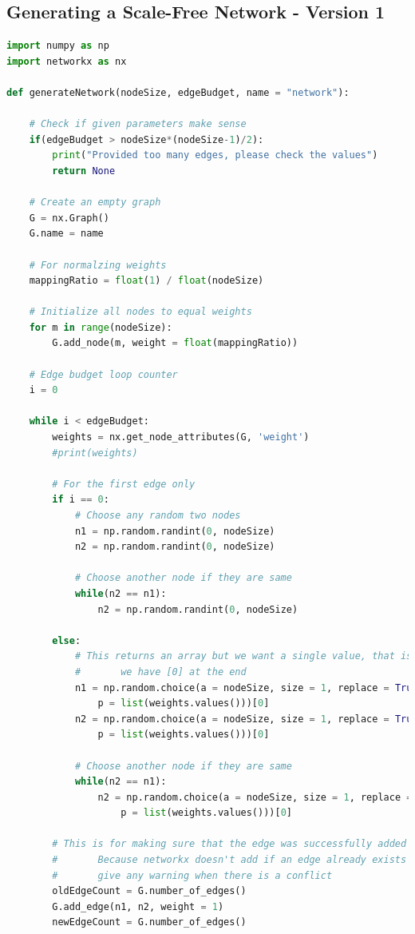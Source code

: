 \documentclass[journal]{IEEEtran}
\begin{document}
\subsection{Generating a Scale-Free Network - Version 1}
\begin{lstlisting}[language=Python]
import numpy as np
import networkx as nx

def generateNetwork(nodeSize, edgeBudget, name = "network"):

    # Check if given parameters make sense
    if(edgeBudget > nodeSize*(nodeSize-1)/2):
        print("Provided too many edges, please check the values")
        return None

    # Create an empty graph
    G = nx.Graph()
    G.name = name

    # For normalzing weights
    mappingRatio = float(1) / float(nodeSize)

    # Initialize all nodes to equal weights
    for m in range(nodeSize):
        G.add_node(m, weight = float(mappingRatio))

    # Edge budget loop counter
    i = 0

    while i < edgeBudget:
        weights = nx.get_node_attributes(G, 'weight')
        #print(weights)

        # For the first edge only
        if i == 0:
            # Choose any random two nodes
            n1 = np.random.randint(0, nodeSize)
            n2 = np.random.randint(0, nodeSize)

            # Choose another node if they are same
            while(n2 == n1):
                n2 = np.random.randint(0, nodeSize)

        else:
            # This returns an array but we want a single value, that is why
            #       we have [0] at the end
            n1 = np.random.choice(a = nodeSize, size = 1, replace = True, 
                p = list(weights.values()))[0]
            n2 = np.random.choice(a = nodeSize, size = 1, replace = True, 
                p = list(weights.values()))[0]

            # Choose another node if they are same
            while(n2 == n1):
                n2 = np.random.choice(a = nodeSize, size = 1, replace = True, 
                    p = list(weights.values()))[0]

        # This is for making sure that the edge was successfully added to the graph.
        #       Because networkx doesn't add if an edge already exists and it doesn't
        #       give any warning when there is a conflict
        oldEdgeCount = G.number_of_edges()
        G.add_edge(n1, n2, weight = 1)
        newEdgeCount = G.number_of_edges()


\end{lstlisting}
\end{document}
